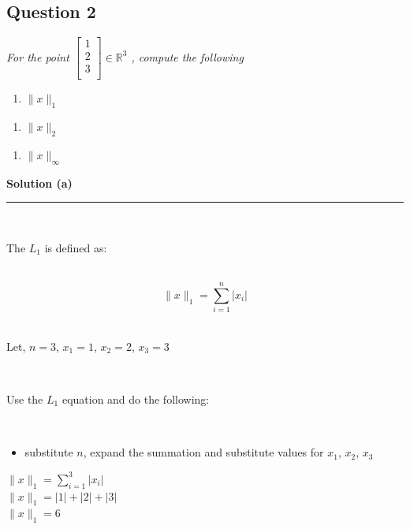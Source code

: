 \documentclass{article}
\begin{document}
\newpage

\subsection*{Question 2}
\textit{For the point $\begin{bmatrix}
    1 \\
    2 \\
    3 \\
\end{bmatrix} \in \mathbb{R}^3$ , compute the following}\\

\begin{enumerate}[label=(a)]
  \item \textit{$\|x\|_1$}
\end{enumerate}

\begin{enumerate}[label=(b)]
  \item \textit{$\|x\|_2$}
\end{enumerate}

\begin{enumerate}[label=(c)]
  \item \textit{$\|x\|_{\infty}$}
\end{enumerate}


\textbf{Solution (a)}

\noindent\rule{\textwidth}{0.4pt}\\

\parbox{\textwidth}{The $L_1$ is defined as:}\\

$$\|x\|_1 = \sum_{i=1}^{n} |x_i|$$\\

\parbox{\textwidth}{Let, $n=3$, $x_1 = 1$, $x_2 = 2$, $x_3 = 3$}\\

\parbox{\textwidth}{Use the $L_1$ equation and do the following:}\\

\begin{itemize}
    \item {substitute $n$, expand the summation and substitute values for $x_1$, $x_2$, $x_3$}
\end{itemize}

$\|x\|_1 = \sum_{i=1}^{3} |x_i|$\\

$\|x\|_1 = |1| + |2| + |3|$\\

$\|x\|_1 = 6$\\
\end{document}
